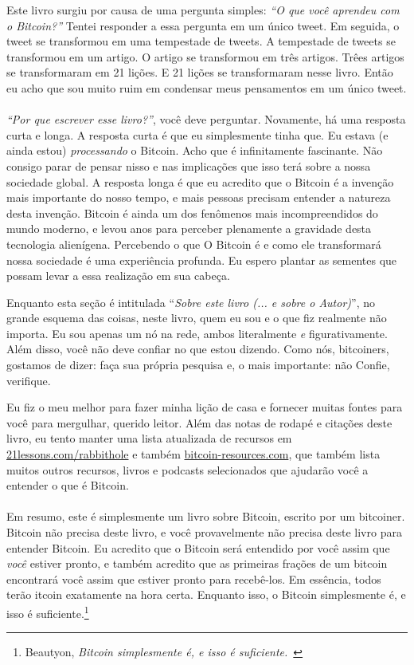 Este livro surgiu por causa de uma pergunta simples: \textit{\enquote{O que 
você aprendeu com o Bitcoin?}} Tentei responder a essa pergunta em um único tweet.
Em seguida, o tweet se transformou em uma tempestade de tweets. A tempestade 
de tweets se transformou em um artigo.
O artigo se transformou em três artigos. Trêes artigos se transformaram em 21 lições.
E 21 lições se transformaram nesse livro. Então eu acho que sou muito ruim em
condensar meus pensamentos em um único tweet.

\paragraph{}
\textit{\enquote{Por que escrever esse livro?}}, você deve perguntar. 
Novamente, há uma resposta curta e longa. A resposta curta é que eu
simplesmente tinha que. Eu estava (e ainda estou) \textit{processando} o Bitcoin. Acho que
é infinitamente fascinante. Não consigo parar de pensar nisso e nas
implicações que isso terá sobre a nossa sociedade global. A resposta longa é que eu
acredito que o Bitcoin é a invenção mais importante do nosso tempo, e
mais pessoas precisam entender a natureza desta invenção. Bitcoin é
ainda um dos fenômenos mais incompreendidos do mundo moderno, e levou
anos para perceber plenamente a gravidade desta tecnologia alienígena. Percebendo o que
O Bitcoin é e como ele transformará nossa sociedade é uma experiência profunda. Eu
espero plantar as sementes que possam levar a essa realização em sua cabeça.

Enquanto esta seção é intitulada \enquote{\textit{Sobre este livro (... e sobre o
Autor)}}, no grande esquema das coisas, neste livro, quem eu sou e o que fiz
realmente não importa. Eu sou apenas um nó na rede, ambos literalmente
\textit{e} figurativamente. Além disso, você não deve confiar no que estou dizendo. Como
nós, bitcoiners, gostamos de dizer: faça sua própria pesquisa e, o mais importante: não
Confie, verifique.

Eu fiz o meu melhor para fazer minha lição de casa e fornecer muitas fontes para você para mergulhar, querido
leitor. Além das notas de rodapé e citações deste livro, eu tento manter uma lista atualizada de recursos em
\href{https://21lessons.com/rabbithole}{21lessons.com/rabbithole} e também 
\href{https://bitcoin-resources.com}{bitcoin-resources.com}, que também lista muitos outros recursos, livros e podcasts selecionados que ajudarão você a
entender o que é Bitcoin.

\paragraph{}
Em resumo, este é simplesmente um livro sobre Bitcoin, escrito por um bitcoiner.
Bitcoin não precisa deste livro, e você provavelmente não precisa deste livro para
entender Bitcoin. Eu acredito que o Bitcoin será entendido por você assim que
\textit{você} estiver pronto, e também acredito que as primeiras frações de um bitcoin
encontrará você assim que estiver pronto para recebê-los. Em essência, todos
terão \bitcoinB{}itcoin exatamente na hora certa. Enquanto isso, o Bitcoin
simplesmente é, e isso é suficiente.\footnote{Beautyon, \textit{Bitcoin
simplesmente é, e isso é suficiente.}~\cite{bitcoin-is}}
